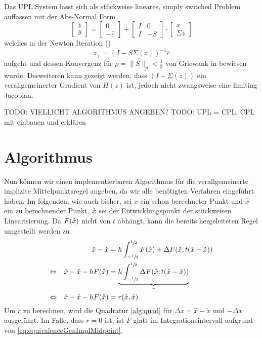 Das UPL System lässt sich als stückweise lineares, simply switched Problem auffassen mit der Abs-Normal Form
\[
 \begin{bmatrix}
  z\\
  y
 \end{bmatrix}
=
 \begin{bmatrix}
  0\\
  -\hat c
 \end{bmatrix}
+
 \begin{bmatrix}
  I & 0\\
  I & -S
 \end{bmatrix}
\cdot
 \begin{bmatrix}
  x\\
  \Sigma z
 \end{bmatrix}
\]
welches in der Newton Iteration (\cite[S.20]{plan})
\begin{equation}
\label{eq:unfoldedNewton}
 z_+ = (I-S\Sigma(z))^{-1}\hat c
\end{equation}
aufgeht und dessen Konvergenz für $\rho = \|S\|_p <\frac{1}{3}$ von Griewank in \cite[Prop. 7.3]{plan} bewiesen wurde. 
Desweiteren kann gezeigt werden, dass $(I-\Sigma(z))$ ein verallgemeinerter Gradient von $H(z)$ ist, jedoch nicht zwangsweise eine limiting Jacobian.
 
TODO: VIELLICHT ALGORITHMUS ANGEBEN?
TODO: UPL = CPL, CPL mit einbauen und erklären

\section{Algorithmus}
Nun können wir einen implementierbaren Algorithmus für die verallgemeinerte implizite Mittelpunktsregel angeben, da wir alle benötigten Verfahren eingeführt haben. Im folgenden, wie auch bisher, sei $\check x$ ein schon berechneter Punkt und $\hat x$ ein zu berechnender Punkt. $\mathring{x}$ sei der Entwicklungspunkt der stückweisen Linearisierung. Da $F(\mathring{x})$ nicht von $t$ abhängt, kann die bereits hergeleiteten Regel umgestellt werden zu 
\begin{equation}
\label{eq:genMidpointAlg}
\begin{aligned}
 && \hat x - \check x &= h\int_{-\sfrac{1}{2}}^{\sfrac{1}{2}}F(\mathring{x})+ \Delta F(\mathring{x};t(\hat x - \check x)) \\
 \Leftrightarrow && \hat x - \check x - hF(\mathring{x}) & =\underbrace{h \int_{-\sfrac{1}{2}}^{\sfrac{1}{2}} \Delta F(\mathring{x};t(\hat x - \check x))}_{r} \\
 \Leftrightarrow && \hat x - \check x - hF(\mathring{x}) & =r(\hat x,\check x)
\end{aligned}
\end{equation}
Um $r$ zu berechnen, wird die Quadratur \ref{alg:quad} für $\Delta x = \hat x - \check x$ und $-\Delta x$ ausgeführt. Im Falle, dass $r=0$ ist, ist $F$ glatt im Integrationsintervall aufgrund von \eqref{eq:equivalenceGenImplMidpoint}.

